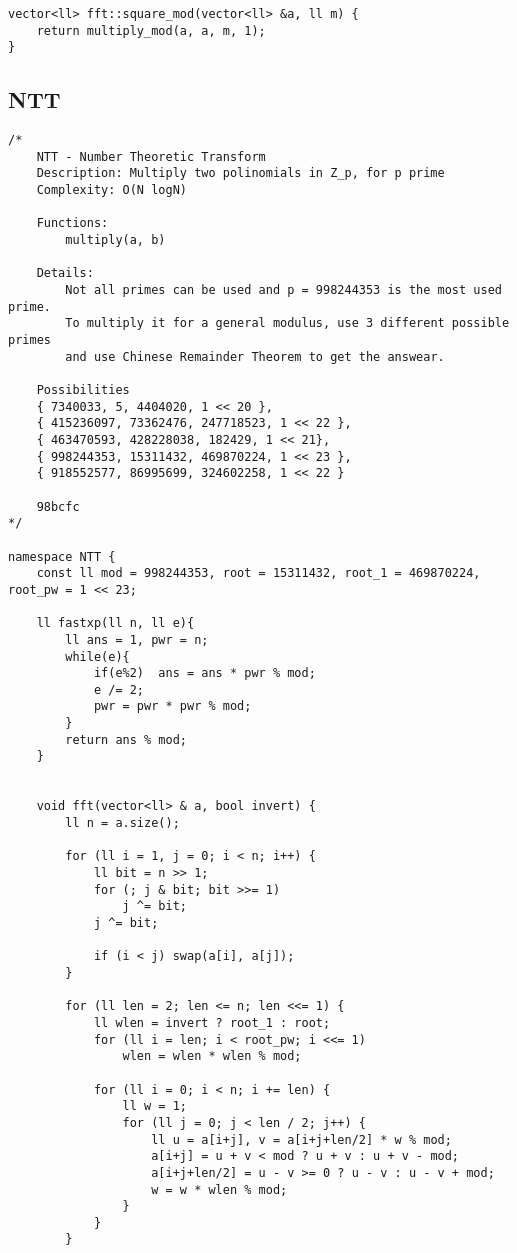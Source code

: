\documentclass{article}
\begin{document}
\begin{verbatim}
vector<ll> fft::square_mod(vector<ll> &a, ll m) {
    return multiply_mod(a, a, m, 1);
}\end{verbatim}
\subsection{NTT}
\begin{verbatim}
/*
    NTT - Number Theoretic Transform
    Description: Multiply two polinomials in Z_p, for p prime
    Complexity: O(N logN)

    Functions:
        multiply(a, b)

    Details:
        Not all primes can be used and p = 998244353 is the most used prime. 
        To multiply it for a general modulus, use 3 different possible primes 
        and use Chinese Remainder Theorem to get the answear.

    Possibilities
    { 7340033, 5, 4404020, 1 << 20 },
    { 415236097, 73362476, 247718523, 1 << 22 },
    { 463470593, 428228038, 182429, 1 << 21},
    { 998244353, 15311432, 469870224, 1 << 23 },
    { 918552577, 86995699, 324602258, 1 << 22 }

    98bcfc
*/

namespace NTT {
    const ll mod = 998244353, root = 15311432, root_1 = 469870224, root_pw = 1 << 23;

    ll fastxp(ll n, ll e){
        ll ans = 1, pwr = n;
        while(e){
            if(e%2)  ans = ans * pwr % mod;
            e /= 2;
            pwr = pwr * pwr % mod;
        }
        return ans % mod;
    }


    void fft(vector<ll> & a, bool invert) {
        ll n = a.size();

        for (ll i = 1, j = 0; i < n; i++) {
            ll bit = n >> 1;
            for (; j & bit; bit >>= 1)
                j ^= bit;
            j ^= bit;

            if (i < j) swap(a[i], a[j]);
        }

        for (ll len = 2; len <= n; len <<= 1) {
            ll wlen = invert ? root_1 : root;
            for (ll i = len; i < root_pw; i <<= 1)
                wlen = wlen * wlen % mod;

            for (ll i = 0; i < n; i += len) {
                ll w = 1;
                for (ll j = 0; j < len / 2; j++) {
                    ll u = a[i+j], v = a[i+j+len/2] * w % mod;
                    a[i+j] = u + v < mod ? u + v : u + v - mod;
                    a[i+j+len/2] = u - v >= 0 ? u - v : u - v + mod;
                    w = w * wlen % mod;
                }
            }
        }


\end{verbatim}
\end{document}

